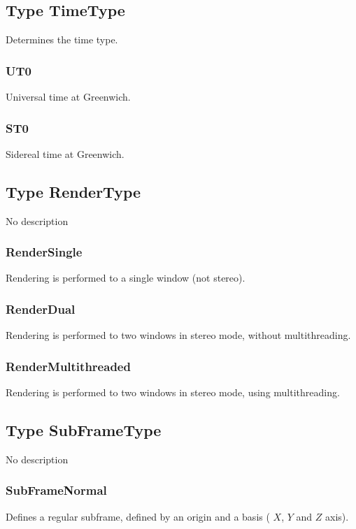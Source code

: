 \subsection{Type TimeType \label{T:TimeType}}
Determines the time type.

\subsubsection{UT0 \label{T:TimeType|UT0}}
Universal time at Greenwich.

\subsubsection{ST0 \label{T:TimeType|ST0}}
Sidereal time at Greenwich.

\subsection{Type RenderType \label{T:RenderType}}
No description

\subsubsection{RenderSingle \label{T:RenderType|RenderSingle}}
Rendering is performed to a single window (not stereo).

\subsubsection{RenderDual \label{T:RenderType|RenderDual}}
Rendering is performed to two windows in stereo mode, without multithreading.

\subsubsection{RenderMultithreaded \label{T:RenderType|RenderMultithreaded}}
Rendering is performed to two windows in stereo mode, using multithreading.

\subsection{Type SubFrameType \label{T:SubFrameType}}
No description

\subsubsection{SubFrameNormal \label{T:SubFrameType|SubFrameNormal}}
Defines a regular subframe, defined by an origin and a basis ( $X$, $Y$ and $Z$ axis).

